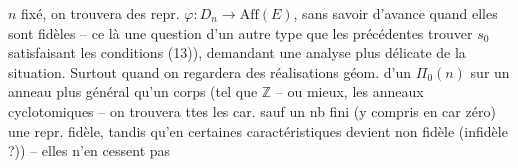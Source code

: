 $n$ fixé, on trouvera  des  repr. $\varphi:D_n\to\mathrm{Aff}(E)$, sans savoir d'avance quand elles sont fidèles -- ce  là une question d'un  autre type que les précédentes   trouver $s_0$ satisfaisant les conditions (13)), demandant une analyse plus  délicate de la situation. Surtout quand on regardera des réalisations géom. d'un $\Pi_0(n)$ sur un anneau plus général qu'un corps (tel que $\mathbb Z$ -- ou  mieux, les anneaux  cyclotomiques -- on trouvera    ttes les car. sauf un nb fini (y compris en car zéro) une repr. fidèle, tandis qu'en certaines caractéristiques  devient non fidèle (infidèle ?)) -- elles n'en cessent pas
